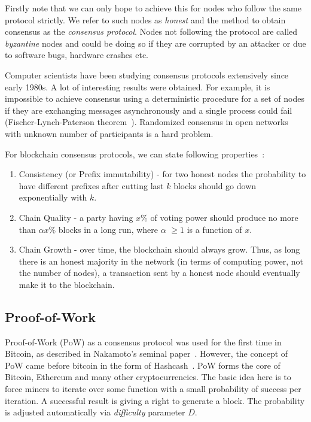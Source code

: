 \documentclass[]{report}   %
\begin{document}
Firstly note that we can only hope to achieve this for nodes who follow the same protocol strictly. We refer to such nodes as \textit{honest} and the method to obtain consensus as the \textit{consensus protocol}. Nodes not following the protocol are called \textit{byzantine} nodes and could be doing so if they are corrupted by an attacker or due to software bugs, hardware crashes etc. 

Computer scientists have been studying consensus protocols extensively since early 1980s. A lot of interesting results were obtained. For example, it is impossible to achieve consensus using a deterministic procedure for a set of nodes if they are exchanging messages asynchronously and a single process could fail (Fischer-Lynch-Paterson theorem~\cite{fischer1985impossibility}). 
Randomized consensus in open networks with unknown number of participants is a hard problem. %


For blockchain consensus protocols, we can state following properties~\cite{Garay2015}:

\begin{enumerate}
\item{Consistency (or Prefix immutability)} - for two honest nodes the probability to have different prefixes after cutting last \(k\) blocks should go down exponentially with \(k\).
\item{Chain Quality} - a party having \(x\%\) of voting power should produce no more than \(\alpha x \%\) blocks in a long run, where \(\alpha\) $\geq 1$ is a function of \(x\).
\item{Chain Growth} - over time, the blockchain should always grow. Thus, as long there is an honest majority in the network (in terms of computing power, not the number of nodes), a transaction sent by a honest node should eventually make it to the blockchain.
\end{enumerate}


\subsection{Proof-of-Work}

Proof-of-Work (PoW) as a consensus protocol was used for the first time in Bitcoin, as described in Nakamoto's seminal paper~\cite{Nakamoto2008}.
However, the concept of PoW came before bitcoin in the form of Hashcash~\cite{back2002hashcash}.
PoW forms the core of Bitcoin, Ethereum and many other cryptocurrencies. The basic idea here is to force miners to iterate over some function with a small probability of success per iteration. A successful result is giving a right to generate a block. The probability is adjusted automatically via \textit{difficulty} parameter \(D\). 
\end{document}
